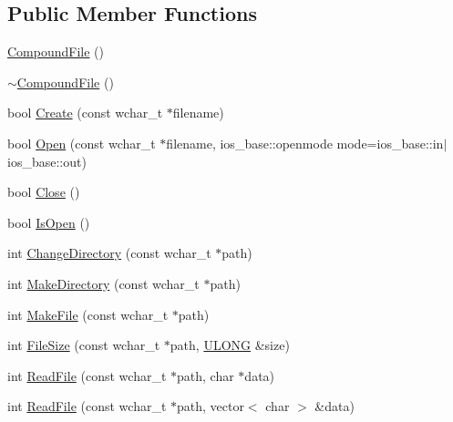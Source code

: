 \subsection*{Public Member Functions}
\begin{DoxyCompactItemize}
\item 
\hyperlink{class_y_compound_files_1_1_compound_file_af4b6835e9949d08d62dab4414fb80c72}{Compound\+File} ()
\item 
\hyperlink{class_y_compound_files_1_1_compound_file_a828355b586c4936e4dbae3f3439d66aa}{$\sim$\+Compound\+File} ()
\item 
bool \hyperlink{class_y_compound_files_1_1_compound_file_a02dbf71e18675f6dcbe2e9a7b3bca189}{Create} (const wchar\+\_\+t $\ast$filename)
\item 
bool \hyperlink{class_y_compound_files_1_1_compound_file_a297267446c654c3361e89592d85c1563}{Open} (const wchar\+\_\+t $\ast$filename, ios\+\_\+base\+::openmode mode=ios\+\_\+base\+::in$\vert$ios\+\_\+base\+::out)
\item 
bool \hyperlink{class_y_compound_files_1_1_compound_file_ab483c310646b994a1948cd463c70ab50}{Close} ()
\item 
bool \hyperlink{class_y_compound_files_1_1_compound_file_aa9b06c1eb80ad96cb0fcde1a4746d474}{Is\+Open} ()
\item 
int \hyperlink{class_y_compound_files_1_1_compound_file_ac87beb0f14a5e4e4576b8b2f81009a5c}{Change\+Directory} (const wchar\+\_\+t $\ast$path)
\item 
int \hyperlink{class_y_compound_files_1_1_compound_file_af9055cd718f70d9c907c020144ce197d}{Make\+Directory} (const wchar\+\_\+t $\ast$path)
\item 
int \hyperlink{class_y_compound_files_1_1_compound_file_a59e8cdb9298793896c27fb13637eae93}{Make\+File} (const wchar\+\_\+t $\ast$path)
\item 
int \hyperlink{class_y_compound_files_1_1_compound_file_a61916e4b689eed64e37e3fa274d97734}{File\+Size} (const wchar\+\_\+t $\ast$path, \hyperlink{_basic_excel_8hpp_abe09d1bea023be6a07cbadde8e955435}{U\+L\+O\+N\+G} \&size)
\item 
int \hyperlink{class_y_compound_files_1_1_compound_file_a0b4e9f62504461a07d74ee10febfee2e}{Read\+File} (const wchar\+\_\+t $\ast$path, char $\ast$data)
\item 
int \hyperlink{class_y_compound_files_1_1_compound_file_a6b888bccad8d92a486e8f25b01a4b170}{Read\+File} (const wchar\+\_\+t $\ast$path, vector$<$ char $>$ \&data)
\item 

\end{DoxyCompactItemize}
